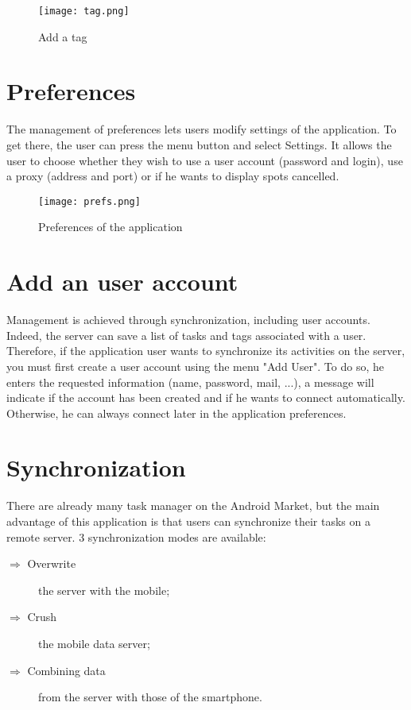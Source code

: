 \begin{figure}[!ht]
    \centering
    \texttt{[image: tag.png]}
    \caption{Add a tag}
\end{figure}

\section{Preferences}

The management of preferences lets users modify settings of the application. To get there, the user can press the menu button and select Settings. It allows the user to choose whether they wish to use a user account (password and login), use a proxy (address and port) or if he wants to display spots cancelled.

\begin{figure}[!ht]
    \centering
    \texttt{[image: prefs.png]}
    \caption{Preferences of the application}
\end{figure}

\section{Add an user account}


Management is achieved through synchronization, including user accounts. Indeed, the server can save a list of tasks and tags associated with a user. Therefore, if the application user wants to synchronize its activities on the server, you must first create a user account using the menu "Add User".
To do so, he enters the requested information (name, password, mail, ...), a message will indicate if the account has been created and if he wants to connect automatically. Otherwise, he can always connect later in the application preferences.

\vspace{3cm}

\section{Synchronization}

There are already many task manager on the Android Market, but the main advantage of this application is that users can synchronize their tasks on a remote server.
3 synchronization modes are available:

\begin{description}
    \item[$\Rightarrow$ Overwrite] the server with the mobile;
    \item[$\Rightarrow$ Crush] the mobile data server;
    \item[$\Rightarrow$ Combining data] from the server with those of the smartphone.
\end{description}

